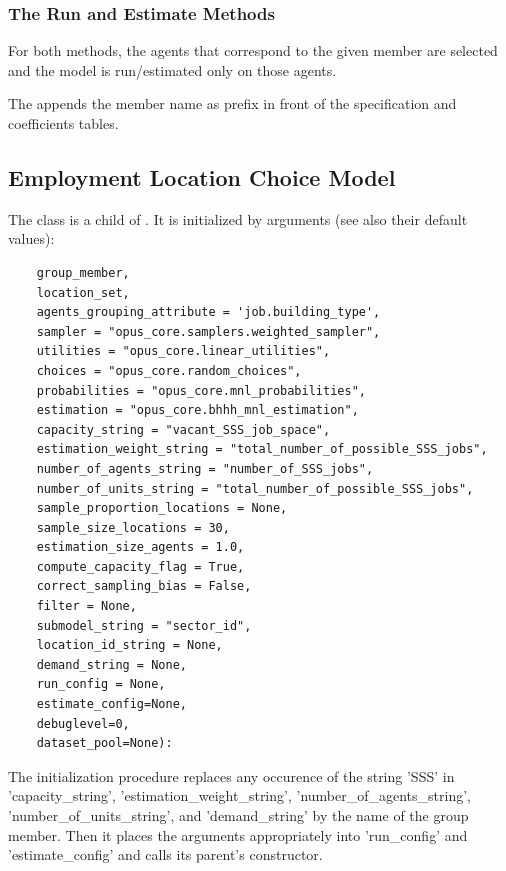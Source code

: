 \subsubsection{The Run and Estimate Methods}
%
For both methods, the agents that correspond to the given member are selected and the model is run/estimated only
on those agents. 

The  appends the member name as prefix in front of the specification and coefficients tables.

\subsection{Employment Location Choice Model}
\modelsindex
\label{sec:elcm} 
%
The class  is a child of . 
It is initialized by arguments (see also their default values):
\begin{verbatim}
    group_member, 
    location_set, 
    agents_grouping_attribute = 'job.building_type',
    sampler = "opus_core.samplers.weighted_sampler", 
    utilities = "opus_core.linear_utilities", 
    choices = "opus_core.random_choices", 
    probabilities = "opus_core.mnl_probabilities", 
    estimation = "opus_core.bhhh_mnl_estimation", 
    capacity_string = "vacant_SSS_job_space",
    estimation_weight_string = "total_number_of_possible_SSS_jobs",
    number_of_agents_string = "number_of_SSS_jobs",
    number_of_units_string = "total_number_of_possible_SSS_jobs",
    sample_proportion_locations = None, 
    sample_size_locations = 30, 
    estimation_size_agents = 1.0, 
    compute_capacity_flag = True, 
    correct_sampling_bias = False,
    filter = None,
    submodel_string = "sector_id", 
    location_id_string = None,
    demand_string = None, 
    run_config = None, 
    estimate_config=None, 
    debuglevel=0, 
    dataset_pool=None):
\end{verbatim}

The initialization procedure replaces any occurence of the string 'SSS' in 'capacity_string', 'estimation_weight_string',
'number_of_agents_string', 'number_of_units_string', and 'demand_string' by the name of the group member. Then it places 
the arguments appropriately into 'run_config' and 'estimate_config' and calls its parent's constructor.

